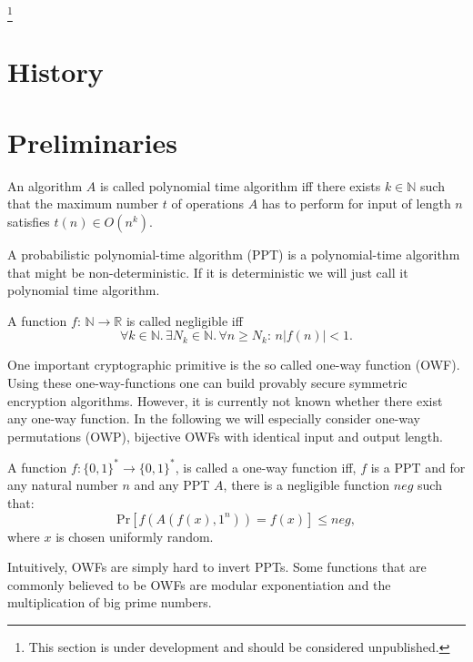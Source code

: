    \footnote{This section is under development and should be considered unpublished.}

\section{History}



\section{Preliminaries}

\begin{definition}
 An algorithm $A$ is called polynomial time algorithm iff there exists $k\in \mathbb{N}$ such that the maximum number $t$ of operations $A$ has to perform for input of length $n$ satisfies $t(n)\in O(n^k)$.
\end{definition}

\begin{definition}
 A probabilistic polynomial-time algorithm (PPT) is a polynomial-time algorithm that might be non-deterministic. If it is deterministic we will just call it polynomial time algorithm.
\end{definition}

\begin{definition}
 A function $f:\,\mathbb{N}\to\mathbb{R}$ is called negligible iff $$\forall k\in\mathbb{N}.\,\exists N_k\in\mathbb{N}.\,\forall n\geq N_k:\,n\left|f(n)\right|<1.$$
\end{definition}

One important cryptographic primitive is the so called one-way function (OWF). Using these one-way-functions one can build provably secure symmetric encryption algorithms. However, it is currently not known whether there exist any one-way function. In the following we will especially consider one-way permutations (OWP), bijective OWFs with identical input and output length. 

\begin{definition}
 A function $f:\{0,1\}^*\to \{0,1\}^*$, is called a one-way function iff, $f$ is a PPT and for any natural number $n$ and any PPT $A$, there is a negligible function $neg$ such that: $$\mathrm{Pr}\left[f(A(f(x),1^n))=f(x)\right]\leq neg,$$ where $x$ is chosen uniformly random.
\end{definition}
Intuitively, OWFs are simply hard to invert PPTs. Some functions that are commonly believed to be OWFs are modular exponentiation and the multiplication of big prime numbers. 

